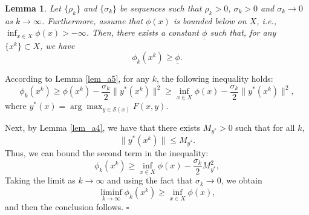 \documentclass{article}
\newtheorem{lemma}[theorem]{Lemma}
\newenvironment{proof}[1][Proof]{\par
	\normalfont\topsep6pt\relax
	\trivlist\item[\hskip\labelsep\itshape #1.]\ignorespaces
}{%
	\hfill\ensuremath{\square}\endtrivlist
}
\begin{document}
\begin{lemma}\label{lower_phi}
  Let $\{\rho_k\}$ and $\{\sigma_k\}$ be sequences such that   $\rho_{k}>0$, $\sigma_{k} >0$ and $\sigma_k \rightarrow 0$ as $k \rightarrow \infty$. Furthermore, assume that $\phi(x)$ is bounded below on $X$, i.e., $\inf_{x \in X} \phi(x) > -\infty$. Then, there exists a constant $\underline{\phi}$ such that, for any $\{x^k\} \subset X$, we have
    \[
    \phi_k(x^k) \ge \underline{\phi}.
    \]
\end{lemma}
    \begin{proof}
      According to Lemma \ref{lem_a5}, for any $k$, the following inequality holds:
      \begin{equation}\label{lemb8_eq1}
       \phi_{k}(x^k) \ge \phi(x^k)- \frac{\sigma_k}{2}\|y^*(x^k)\|^2 \ge \inf_{x \in X} \phi(x) - \frac{\sigma_k}{2}\|y^*(x^k)\|^2,
      \end{equation}
       where $y^*(x) = \arg\max_{y \in \mathcal{S}(x)}F(x,y)$.

Next, by Lemma \ref{lem_a4}, we have that there exists $M_{y^*} > 0$ such that for all $k$,
 \[
 \|y^*(x^k)\| \le M_{y^*}.
 \]    
 Thus, we can bound the second term in the inequality:
 \[
 \phi_{k}(x^k) \ge \inf_{x \in X} \phi(x) - \frac{\sigma_k}{2}M_{y^*}^2,
 \]
 Taking the limit as $k \rightarrow \infty$ and using the fact that $\sigma_k \rightarrow 0$, we obtain
 \[
 \liminf_{k \rightarrow \infty}\phi_{k}(x^k) \ge \inf_{x \in X} \phi(x),
 \]
 and then the conclusion follows.
    \end{proof}
    
\end{document}

